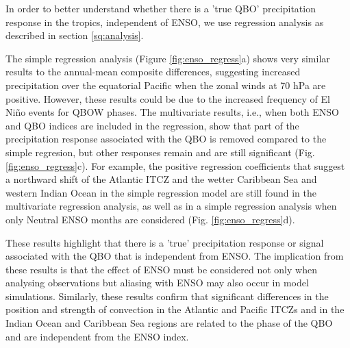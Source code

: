In order to better understand whether there is a 'true QBO' precipitation response in the tropics, independent of ENSO, we use regression analysis as described in section \ref{sq:analysis}.
 


The simple regression analysis (Figure \ref{fig:enso_regress}a) shows very similar results to the annual-mean composite differences, suggesting increased precipitation over the equatorial Pacific when the zonal winds at 70 hPa are positive. However, these results could be due to the increased frequency of El Niño events for QBOW phases. 
The multivariate results, i.e., when both ENSO and QBO indices are included in the regression, show that part of the precipitation response associated with the QBO is removed compared to the simple regresion, but other responses remain and are still significant (Fig. \ref{fig:enso_regress}c). 
For example, the positive regression coefficients that suggest a northward shift of the Atlantic ITCZ and the wetter Caribbean Sea and western Indian Ocean in the simple regression model are still found in the multivariate regression analysis, as well as in a simple regression analysis when only Neutral ENSO months are considered (Fig. \ref{fig:enso_regress}d). 

These results highlight that there is a 'true' precipitation response or signal associated with the QBO that is independent from ENSO. 
The implication from these results is that the effect of ENSO must be considered not only when analysing observations but aliasing with ENSO may also occur in model simulations. Similarly, these results confirm that significant differences in the position and strength of convection in the Atlantic and Pacific ITCZs and in the Indian Ocean and Caribbean Sea regions are related to the phase of the QBO and are independent from the ENSO index.

